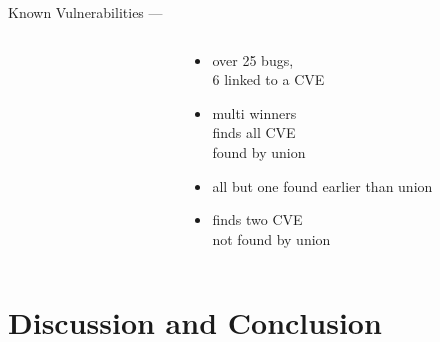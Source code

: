 \documentclass[\HandoutMode,table]{beamer}
\newcommand\figwidth\textwidth
\begin{document}
\begin{frame}{Known Vulnerabilities --- \listswf}
    \begin{columns}
        \begin{column}{.66\textwidth}
            \renewcommand\figwidth{.33\textwidth}
            \vspace{-20pt}
            \begin{figure}
                \vspace{-8pt}
            \end{figure}
        \end{column}
        \begin{column}{.33\textwidth}
            \begin{itemize}
                \item{} over 25 bugs,\\6 linked to a CVE
                \item{} multi winners\\finds all CVE\\found by union
                \item{} all but one found earlier than union
                \item{} finds two CVE\\not found by union
            \end{itemize}
        \end{column}
    \end{columns}
\end{frame}

\section{Discussion and Conclusion}

\begin{frame}
    \tableofcontents[currentsection]
\end{frame}
\end{document}
